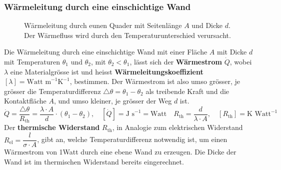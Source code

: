 \subsubsection{Wärmeleitung durch eine einschichtige Wand}
\begin{figure}[H]
\centering
\caption{Wärmeleitung durch eunen Quader mit Seitenlänge $A$ und Dicke $d$. Der Wärmefluss wird durch den Temperaturunterschied verursacht.}
\label{fig_Ih}
\end{figure}
Die Wärmeleitung durch eine einschichtige Wand mit einer Fläche $A$ mit Dicke $d$ mit Temperaturen $\theta_1$ und $\theta_2$, mit $\theta_2<\theta_1$, lässt sich der \textbf{Wärmestrom} $\dot{Q}$, wobei $\lambda$ eine Materialgrösse ist und heisst \textbf{Wärmeleitungskoeffizient} $[\lambda]=\text{Watt m}^{-1} \text{K}^{-1}$, bestimmen. Der Wärmestrom ist also umso grösser, je grösser die Temperaturdifferenz $\triangle \theta = \theta_1-\theta_2$ als treibende Kraft und die Kontaktfläche $A$, und umso kleiner, je grösser der Weg $d$ ist.
\begin{equation}
\boxed{\dot{Q}=\dfrac{\triangle \theta}{R_{\text{th}}}=\dfrac{\lambda\cdot A}{d}\cdot \left(\theta_1-\theta_2\right),\quad [\dot{Q}]=\text{J s}^{-1}=\text{Watt}}\quad \boxed{R_{\text{th}}=\dfrac{d}{\lambda\cdot A},\quad [R_{\text{th}}]=\text{K Watt}^{-1}}
\end{equation}
Der \textbf{thermische Widerstand} $R_{\text{th}}$, in Analogie zum elektrischen Widerstand $R_{\text{el}}=\dfrac{l}{\sigma\cdot A}$, gibt an, welche Temperaturdifferenz notwendig ist, um einen Wärmestrom von 1Watt durch eine ebene Wand zu erzeugen. Die Dicke der Wand ist im thermischen Widerstand bereits eingerechnet.
